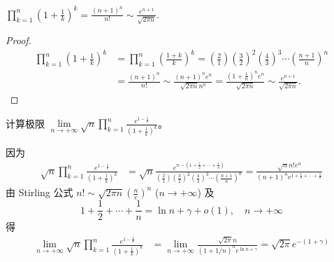 \documentclass[../../main.tex]{subfiles}
\begin{document}
\begin{proposition}
$\prod_{k=1}^n{\left( 1+\frac{1}{k} \right) ^k}=\frac{\left( n+1 \right) ^n}{n!}\sim \frac{e^{n+1}}{\sqrt{2\pi n}}.$
\end{proposition}
\begin{proof}
\begin{align*}
\prod_{k=1}^n{\left( 1+\frac{1}{k} \right) ^k}&=\prod_{k=1}^n{\left( \frac{1+k}{k} \right) ^k}=\left( \frac{2}{1} \right) \left( \frac{3}{2} \right) ^2\left( \frac{4}{3} \right) ^3\cdots \left( \frac{n+1}{n} \right) ^n
\\
&=\frac{\left( n+1 \right) ^n}{n!}\sim \frac{\left( n+1 \right) ^ne^n}{\sqrt{2\pi n}n^n}=\frac{\left( 1+\frac{1}{n} \right) ^ne^n}{\sqrt{2\pi n}}\sim \frac{e^{n+1}}{\sqrt{2\pi n}}.
\end{align*}
\end{proof}

\begin{example}
计算极限 $\lim\limits_{n \to +\infty} \sqrt{n} \prod_{k = 1}^{n} \frac{e^{1 - \frac{1}{k}}}{(1 + \frac{1}{k})^k}$。
\end{example}
\begin{solution}
因为
\begin{align*}
\sqrt{n} \prod_{k = 1}^{n} \frac{e^{1 - \frac{1}{k}}}{(1 + \frac{1}{k})^k} &= \sqrt{n} \frac{e^{n - (1 + \frac{1}{2} + \cdots + \frac{1}{n})}}{(\frac{2}{1})(\frac{3}{2})^2 (\frac{4}{3})^3 \cdots (\frac{n + 1}{n})^n} = \frac{\sqrt{n}n!e^n}{(n + 1)^n e^{1 + \frac{1}{2} + \cdots + \frac{1}{n}}}
\end{align*}
由 Stirling 公式 $n! \sim \sqrt{2\pi n} (\frac{n}{e})^n$ ($n \to +\infty$) 及
\[1 + \frac{1}{2} + \cdots + \frac{1}{n} = \ln n + \gamma + o(1),\quad n \to +\infty\]
得
\begin{align*}
\lim_{n \to +\infty} \sqrt{n} \prod_{k = 1}^{n} \frac{e^{1 - \frac{1}{k}}}{(1 + \frac{1}{k})^k} &= \lim_{n \to +\infty} \frac{\sqrt{2\pi}n}{(1 + 1/n)^n e^{\ln n + \gamma}} = \sqrt{2\pi} e^{-(1 + \gamma)}
\end{align*} 
\end{solution}
\end{document}
